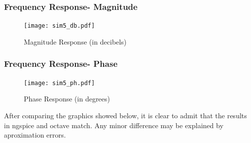 \subsubsection{Frequency Response- Magnitude}

\begin{figure}[h] \centering
\texttt{[image: sim5\_db.pdf]}
\caption{Magnitude Response (in decibels)}
\label{fig:sim5_db}
\end{figure}

\subsubsection{Frequency Response- Phase}


\begin{figure}[h] \centering
\texttt{[image: sim5\_ph.pdf]}
\caption{Phase Response (in degrees)}
\label{fig:sim5_ph}
\end{figure}
\newpage

After comparing the graphics showed below, it is clear to admit that the results in ngspice and octave match. Any minor difference may be explained by aproximation errors.




